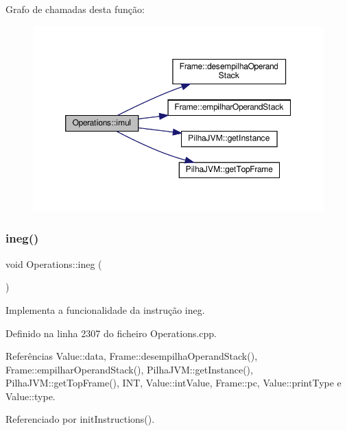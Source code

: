 Grafo de chamadas desta função\+:\nopagebreak
\begin{figure}[H]
\begin{center}
\leavevmode
\includegraphics[width=350pt]{classOperations_a01b2ffdd380327b31b03657eb99b8a81_cgraph}
\end{center}
\end{figure}
\mbox{\label{classOperations_a819d5dd66c64a6801a1599b5abf81ae7}} 
\subsubsection{\texorpdfstring{ineg()}{ineg()}}
{\footnotesize\ttfamily void Operations\+::ineg (\begin{DoxyParamCaption}{ }\end{DoxyParamCaption})\hspace{0.3cm}{\ttfamily [private]}}



Implementa a funcionalidade da instrução ineg. 



Definido na linha 2307 do ficheiro Operations.\+cpp.



Referências Value\+::data, Frame\+::desempilha\+Operand\+Stack(), Frame\+::empilhar\+Operand\+Stack(), Pilha\+J\+V\+M\+::get\+Instance(), Pilha\+J\+V\+M\+::get\+Top\+Frame(), I\+NT, Value\+::int\+Value, Frame\+::pc, Value\+::print\+Type e Value\+::type.



Referenciado por init\+Instructions().

